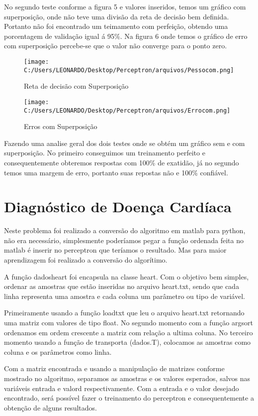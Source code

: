 \documentclass[
12pt, 
a4paper,
oneside,			%
english,			%
french,				%
spanish,			%
brazil,	
]{abntex2}
\begin{document}
No segundo teste conforme a figura 5 e valores inseridos, temos um gráfico com superposição, onde não teve uma divisão da reta de decisão bem definida. Portanto não foi encontrado um teimamento com perfeição, obtendo uma porcentagem de validação igual á 95\%. Na figura 6 onde temos o gráfico de erro com superposição percebe-se que o valor não converge para o ponto zero. 

\begin{figure}
	\centering
	\texttt{[image: C:/Users/LEONARDO/Desktop/Perceptron/arquivos/Pessocom.png]}
	\caption{Reta de decisão com Superposição}
\end{figure}

\begin{figure}
	\centering
	\texttt{[image: C:/Users/LEONARDO/Desktop/Perceptron/arquivos/Errocom.png]}
	\caption{Erros com Superposição}
\end{figure}

Fazendo uma analise geral dos dois testes onde se obtém um gráfico sem e com superposição. No primeiro conseguimos um treinamento perfeito e consequentemente obteremos respostas com 100\% de exatidão, já no segundo temos uma margem de erro, portanto suas repostas não e 100\% confiável.  

\section{Diagnóstico de Doença Cardíaca}

Neste problema foi realizado a conversão do algoritmo em matlab para python, não era necessário, simplesmente poderíamos pegar a função ordenada feita no matlab é inserir no perceptron que teríamos o resultado. Mas para maior aprendizagem foi realizado a conversão do algorítimo.     

A função dadosheart foi encapsula na classe heart. Com o objetivo bem simples, ordenar as amostras que estão inseridas no arquivo heart.txt, sendo que cada linha representa uma amostra e cada coluna um parâmetro ou tipo de variável. 

Primeiramente usando a função loadtxt que leu o arquivo heart.txt retornando uma matriz com valores de tipo float. No segundo momento com a função argsort ordenamos em ordem crescente  a matriz com relação a ultima coluna. No terceiro momento usando a função de transporta (dados.T), colocamos as amostras como coluna e os parâmetros como linha. 

Com a matriz encontrada e usando a manipulação de matrizes conforme mostrado no algoritmo, separamos as amostras e os valores esperados, salvos nas variáveis entrada e valord respectivamente. Com a entrada e o valor desejado encontrado, será possível fazer o treinamento do perceptron e consequentemente a obtenção de alguns resultados.     
  
\end{document}
